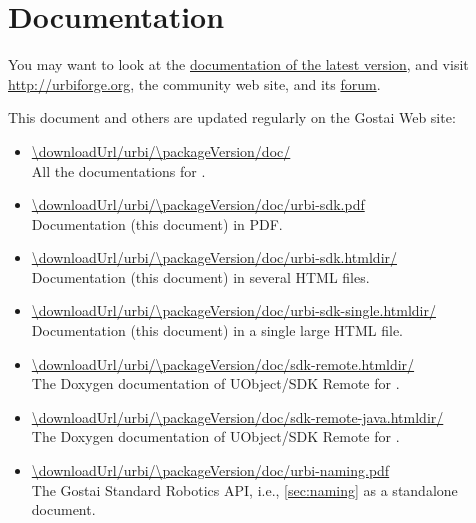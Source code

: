 \section{Documentation}

You may want to look at the
\href{\downloadUrl/urbi/\packageMajor.x/doc/}{documentation of the latest
  version}, and visit \url{http://urbiforge.org}, the \urbi community web
site, and its \href{http://forum.urbiforge.org}{forum}.

This document and others are updated regularly on the Gostai Web site:
\newcommand{\docItem}[2]{
  \item \url{\downloadUrl/urbi/\packageVersion/doc/#1} \\ #2.
}
\begin{itemize}
  \docItem{}
  {All the documentations for \urbi \packageVersion}
  \docItem{urbi-sdk.pdf}
  {\usdk Documentation (this document) in PDF}
  \docItem{urbi-sdk.htmldir/}
  {\usdk Documentation (this document) in several HTML files}
  \docItem{urbi-sdk-single.htmldir/}
  {\usdk Documentation (this document) in a single large HTML file}
  \docItem{sdk-remote.htmldir/}
  {The Doxygen documentation of UObject/SDK Remote for \Cxx}
  \docItem{sdk-remote-java.htmldir/}
  {The Doxygen documentation of UObject/SDK Remote for \Java}
  \docItem{urbi-naming.pdf}{The Gostai Standard Robotics API, i.e.,
  \autoref{sec:naming} as a standalone document}
\end{itemize}




